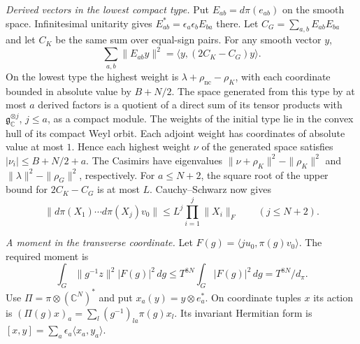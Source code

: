 \emph{Derived vectors in the lowest compact type.}
Put \(E_{ab}=d\pi(e_{ab})\) on the smooth space. Infinitesimal
unitarity gives \(E_{ab}^*=\epsilon_a\epsilon_b E_{ba}\) there. Let
\(C_G=\sum_{a,b} E_{ab}E_{ba}\) and let \(C_K\) be the same sum over
equal-sign pairs. For any smooth vector \(y\),
\[
 \sum_{a,b}\|E_{ab}y\|^2=\langle y,(2C_K-C_G)y\rangle .
\]
On the lowest type the highest weight is
\(\lambda+\rho_{\mathrm{nc}}-\rho_K\), with each coordinate bounded in
absolute value by \(B+N/2\). The space generated from this type by at
most \(a\) derived factors is a quotient of a direct sum of its tensor
products with \(\mathfrak g_{\mathbb C}^{\otimes j}\), \(j\le a\), as
a compact module. The weights of the initial type lie in the convex
hull of its compact Weyl orbit. Each adjoint weight has coordinates of
absolute value at most \(1\). Hence each highest weight \(\nu\) of the
generated space satisfies \(|\nu_i|\le B+N/2+a\). The Casimirs have
eigenvalues \(\|\nu+\rho_K\|^2-\|\rho_K\|^2\) and
\(\|\lambda\|^2-\|\rho_G\|^2\), respectively. For \(a\le N+2\), the
square root of the upper bound for \(2C_K-C_G\) is at most \(L\).
Cauchy--Schwarz now gives
\begin{equation}
 \|d\pi(X_1)\cdots d\pi(X_j)v_0\|
 \le L^j\prod_{i=1}^j\|X_i\|_F\qquad (j\le N+2).
 \label{eq:real-branch-derived}
\end{equation}

\emph{A moment in the transverse coordinate.}
Let \(F(g)=\langle j u_0,\pi(g)v_0\rangle\). The required moment is
\begin{equation}
 \int_G \|g^{-1}z\|^2 |F(g)|^2\,dg
 \le T^{8N}\int_G |F(g)|^2\,dg=T^{8N}/d_\pi .
 \label{eq:real-branch-transverse-moment}
\end{equation}
Use \(\Pi=\pi\otimes (\mathbb C^N)^*\) and put
\(x_a(y)=y\otimes e_a^*\). On coordinate tuples \(x\) its action is
\((\Pi(g)x)_a=\sum_l(g^{-1})_{la}\pi(g)x_l\). Its invariant Hermitian
form is \([x,y]=\sum_a\epsilon_a\langle x_a,y_a\rangle\).


